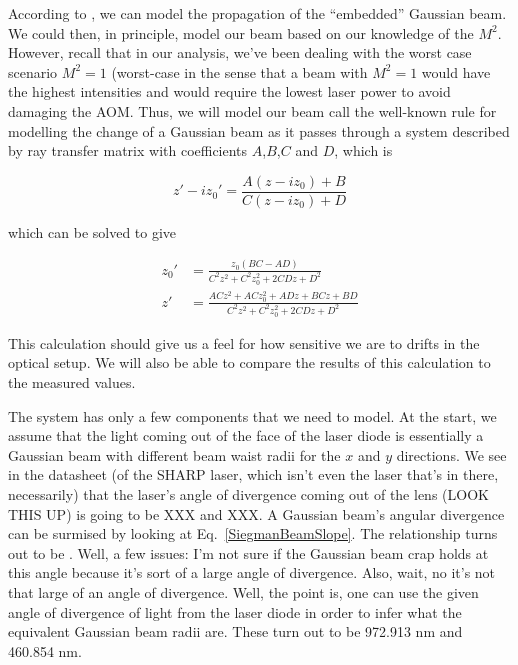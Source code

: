 
According to \cite{SiegmanBeamQuality}, we can model the propagation of the ``embedded'' Gaussian beam. We could then, in principle, model our beam based on our knowledge of the $M^2$. However, recall that in our analysis, we've been dealing with the worst case scenario $M^2=1$ (worst-case in the sense that a beam with $M^2=1$ would have the highest intensities and would require the lowest laser power to avoid damaging the AOM. Thus, we will model our beam call the well-known rule for modelling the change of a Gaussian beam as it passes through a system described by ray transfer matrix with coefficients $A$,$B$,$C$ and $D$, which is 

\begin{equation} \label{ABCDlawforGaussianBeams}
z'-iz_0'=\frac{A(z-iz_0)+B}{C(z-iz_0)+D}
\end{equation}
\cite{BYUOpticsBook}

which can be solved to give 

\begin{align}
z_0' &= \frac{ z_0 (BC-AD)}{C^2z^2+C^2z_0^2+2 C D z + D^2} \\
z' &=\frac{AC z^2+ACz_0^2+ADz+BCz+BD}{C^2z^2+C^2z_0^2+2 C D z + D^2}
\end{align}

This calculation should give us a feel for how sensitive we are to drifts in the optical setup. We will also be able to compare the results of this calculation to the measured values. 

The system has only a few components that we need to model. At the start, we assume that the light coming out of the face of the laser diode is essentially a Gaussian beam with different beam waist radii for the $x$ and $y$ directions. We see in the datasheet (of the SHARP laser, which isn't even the laser that's in there, necessarily) that the laser's angle of divergence coming out of the lens (LOOK THIS UP) is going to be XXX and XXX. A Gaussian beam's angular divergence can be surmised by looking at Eq.\ \ref{SiegmanBeamSlope}. The relationship turns out to be \cite{MellesGriotGaussian}. Well, a few issues: I'm not sure if the Gaussian beam crap holds at this angle because it's sort of a large angle of divergence. Also, wait, no it's not that large of an angle of divergence. Well, the point is, one can use the given angle of divergence of light from the laser diode in order to infer what the equivalent Gaussian beam radii are. These turn out to be 972.913 nm and 460.854 nm. 

